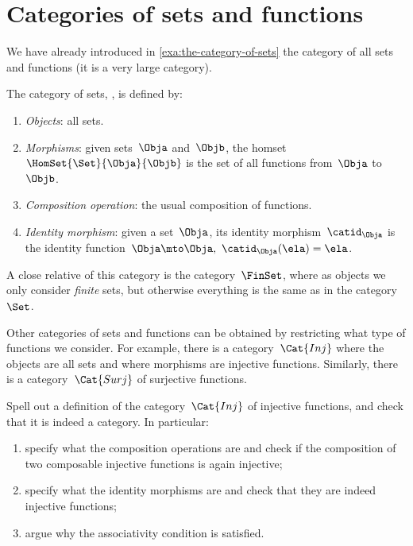 
\section{Categories of sets and functions}

We have already introduced in \cref{exa:the-category-of-sets} the category of all sets and functions (it is a very large category).

\begin{ctdefinition}
    \label{def:Set}
    The category of sets, \iindex{\Set}, is defined by:
    \begin{enumerate}
        \item \emph{Objects}: all sets.
        \item \emph{Morphisms}: given sets~$\Obja$ and~$\Objb$, the homset~$\HomSet{\Set}{\Obja}{\Objb}$ is the set of all functions from~$\Obja$ to~$\Objb$.
        \item \emph{Composition operation}: the usual composition of functions.
        \item \emph{Identity morphism}: given a set~$\Obja$, its identity morphism~$\catid_\Obja$ is the identity function~$\Obja \mto \Obja, \ \catid_\Obja(\ela) = \ela$.
    \end{enumerate}
\end{ctdefinition}

A close relative of this category is the category~$\FinSet$, where as objects we only consider \emph{finite} sets, but otherwise everything is the same as in the category~$\Set$.

Other categories of sets and functions can be obtained by restricting what type of functions we consider.
For example, there is a category~$\Cat{Inj}$ where the objects are all sets and where morphisms are injective functions.
Similarly, there is a category~$\Cat{Surj}$ of surjective functions.

\begin{exercise}
    Spell out a definition of the category~$\Cat{Inj}$ of injective functions, and check that it is indeed a category.
    In particular:
    \begin{enumerate}
        \item specify what the composition operations are and check if the composition of two composable injective functions is again injective;
        \item specify what the identity morphisms are and check that they are indeed injective functions;
        \item argue why the associativity condition is satisfied.
    \end{enumerate}
\end{exercise}

